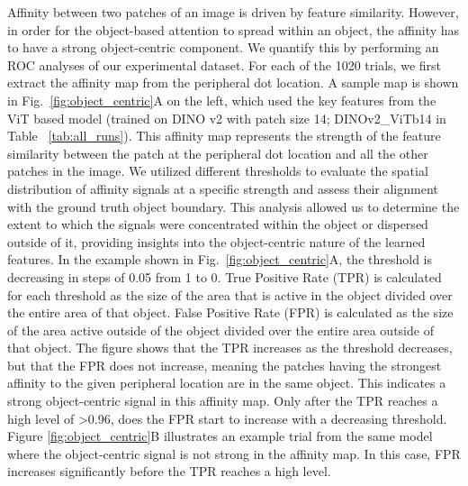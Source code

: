 \documentclass{article}
\begin{document}
Affinity between two patches of an image is driven by feature similarity. However, in order for the object-based attention to spread within an object, the affinity has to have a strong object-centric component. We quantify this by performing an ROC analyses of our experimental dataset. For each of the 1020 trials, we first extract the affinity map from the peripheral dot location. A sample map is shown in Fig.~\ref{fig:object_centric}A on the left, which used the key features from the ViT based model (trained on DINO v2 with patch size 14; DINOv2\_ViTb14 in Table ~\ref{tab:all_runs}). This affinity map represents the strength of the feature similarity between the patch at the peripheral dot location and all the other patches in the image. We utilized different thresholds to evaluate the spatial distribution of affinity signals at a specific strength and assess their alignment with the ground truth object boundary. This analysis allowed us to determine the extent to which the signals were concentrated within the object or dispersed outside of it, providing insights into the object-centric nature of the learned features. In the example shown in Fig.~\ref{fig:object_centric}A, the threshold is decreasing in steps of 0.05 from 1 to 0. True Positive Rate (TPR) is calculated for each threshold as the size of the area that is active in the object divided over the entire area of that object. False Positive Rate (FPR) is calculated as the size of the area active outside of the object divided over the entire area outside of that object. The figure shows that the TPR increases as the threshold decreases, but that the FPR does not increase, meaning the patches having the strongest affinity to the given peripheral location are in the same object. This indicates a strong object-centric signal in this affinity map. Only after the TPR reaches a high level of >0.96, does the FPR start to increase with a decreasing threshold. Figure \ref{fig:object_centric}B illustrates an example trial from the same model where the object-centric signal is not strong in the affinity map. In this case, FPR increases significantly before the TPR reaches a high level.  

\end{document}
